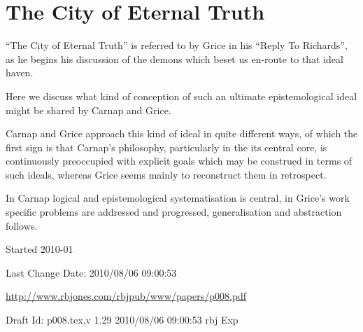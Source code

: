 \documentclass[10pt,titlepage]{book}
\begin{document}
\chapter{The City of Eternal Truth}


``The City of Eternal Truth'' is referred to by Grice in his ``Reply To Richards''\cite{grice86b}, as he begins his discussion of the demons which beset us en-route to that ideal haven.

Here we discuss what kind of conception of such an ultimate epistemological ideal might be shared by Carnap and Grice.

Carnap and Grice approach this kind of ideal in quite different ways, of which the first sign is that Carnap's philosophy, particularly in the its central core, is continuously preoccupied with explicit goals which may be construed in terms of such ideals, whereas Grice seems mainly to reconstruct them in retrospect.

In Carnap logical and epistemological systematisation is central, in Grice's work specific problems are addressed and progressed, generalisation and abstraction follows.


\backmatter

%




\label{index}
{\twocolumn[]
{\small\printindex}}

\vfill

\tiny{
Started 2010-01

Last Change $ $Date: 2010/08/06 09:00:53 $ $

\href{http://www.rbjones.com/rbjpub/www/papers/p008.pdf}{http://www.rbjones.com/rbjpub/www/papers/p008.pdf}

Draft $ $Id: p008.tex,v 1.29 2010/08/06 09:00:53 rbj Exp $ $
}%
\end{document}
